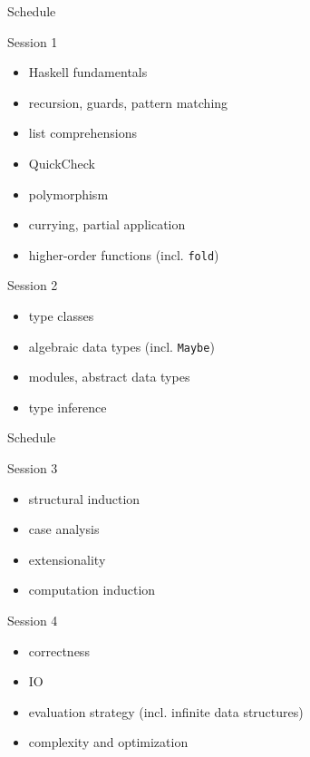 \documentclass{beamer}
\def\code#1{\texttt{#1}}
\begin{document}
\begin{frame}{Schedule}

\begin{block}{Session 1}
\begin{itemize}
    \item Haskell fundamentals
    \item recursion, guards, pattern matching
    \item list comprehensions
    \item QuickCheck
    \item polymorphism
    \item currying, partial application
    \item higher-order functions (incl. \code{fold})
\end{itemize}
\end{block}

\begin{block}{Session 2}
\begin{itemize}
    \item type classes
    \item algebraic data types (incl. \code{Maybe})
    \item modules, abstract data types
    \item type inference
\end{itemize}
\end{block}

\end{frame}

\begin{frame}{Schedule}

\begin{block}{Session 3}
\begin{itemize}
    \item structural induction
    \item case analysis
    \item extensionality
    \item computation induction
\end{itemize}
\end{block}

\begin{block}{Session 4}
\begin{itemize}
    \item correctness
    \item IO
    \item evaluation strategy (incl. infinite data structures)
    \item complexity and optimization
\end{itemize}
\end{block}

\end{frame}
\end{document}
